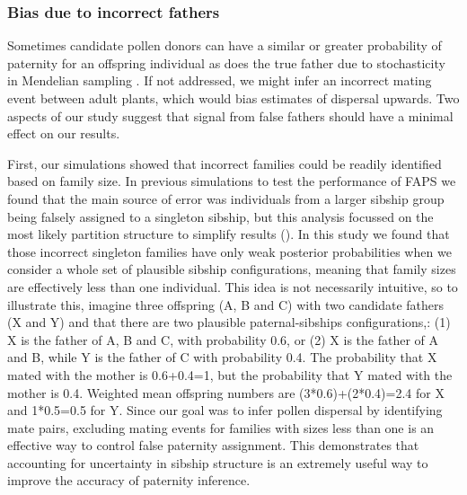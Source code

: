 \documentclass[10pt, a4paper, twocolumn]{article} %
\begin{document}
\subsubsection{Bias due to incorrect fathers}

Sometimes candidate pollen donors can have a similar or greater probability of paternity for an offspring individual as does the true father due to stochasticity in Mendelian sampling \cite{thompson1976paradox}.
If not addressed, we might infer an incorrect mating event between adult plants, which would bias estimates of dispersal upwards.
Two aspects of our study suggest that signal from false fathers should have a minimal effect on our results.

First, our simulations showed that incorrect families could be readily identified based on family size.
In previous simulations to test the performance of FAPS we found that the main source of error was individuals from a larger sibship group being falsely assigned to a singleton sibship, but this analysis focussed on the most likely partition structure to simplify results (\cite{ellis2018efficient}).
In this study we found that those incorrect singleton families have only weak posterior probabilities when we consider a whole set of plausible sibship configurations, meaning that family sizes are effectively less than one individual.
This idea is not necessarily intuitive, so to illustrate this, imagine three offspring (A, B and C) with two candidate fathers (X and Y) and that there are two plausible paternal-sibships configurations,: (1) X is the father of A, B and C, with probability 0.6, or (2) X is the father of A and B, while Y is the father of C with probability 0.4.
The probability that X mated with the mother is 0.6+0.4=1, but the probability that Y mated with the mother is 0.4.
Weighted mean offspring numbers are (3*0.6)+(2*0.4)=2.4 for X and 1*0.5=0.5 for Y.
Since our goal was to infer pollen dispersal by identifying mate pairs, excluding mating events for families with sizes less than one is an effective way to control false paternity assignment.
This demonstrates that accounting for uncertainty in sibship structure is an extremely useful way to improve the accuracy of paternity inference.
\end{document}
